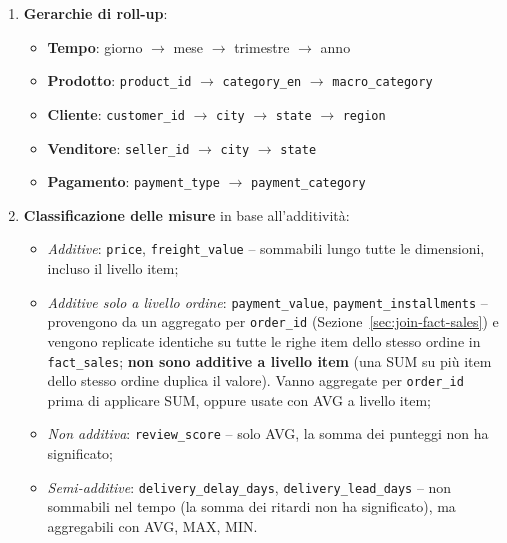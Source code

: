 \documentclass[12pt,a4paper]{article}
\begin{document}
\begin{enumerate}
  \item \textbf{Gerarchie di roll-up}:
        \begin{itemize}
          \item \textbf{Tempo}: giorno $\to$ mese $\to$ trimestre $\to$ anno
          \item \textbf{Prodotto}: \texttt{product\_id} $\to$ \texttt{category\_en}
                $\to$ \texttt{macro\_category}
          \item \textbf{Cliente}: \texttt{customer\_id} $\to$ \texttt{city} $\to$
                \texttt{state} $\to$ \texttt{region}
          \item \textbf{Venditore}: \texttt{seller\_id} $\to$ \texttt{city} $\to$
                \texttt{state}
          \item \textbf{Pagamento}: \texttt{payment\_type} $\to$
                \texttt{payment\_category}
        \end{itemize}

  \item \textbf{Classificazione delle misure} in base all'additività:
        \begin{itemize}
        \sloppy
          \item \textit{Additive}: \texttt{price}, \texttt{freight\_value} --
                sommabili lungo tutte le dimensioni, incluso il livello item;
          \item \textit{Additive solo a livello ordine}: \texttt{payment\_value},
                \texttt{payment\_installments} -- provengono da un aggregato per
                \texttt{order\_id} (Sezione~\ref{sec:join-fact-sales}) e vengono
                replicate identiche su tutte le righe item dello stesso ordine in
                \texttt{fact\_sales}; \textbf{non sono additive a livello item} (una
                SUM su più item dello stesso ordine duplica il valore). Vanno
                aggregate per \texttt{order\_id} prima di applicare SUM, oppure usate
                con AVG a livello item;
          \item \textit{Non additiva}: \texttt{review\_score} -- solo AVG, la somma
                dei punteggi non ha significato;
          \item \textit{Semi-additive}: \texttt{delivery\_delay\_days},
                \texttt{delivery\_lead\_days} -- non sommabili nel tempo (la somma dei
                ritardi non ha significato), ma aggregabili con AVG, MAX, MIN.
        \end{itemize}
\end{enumerate}
\end{document}
